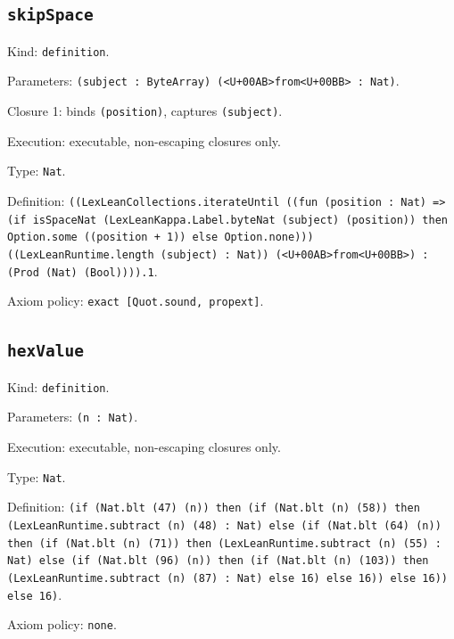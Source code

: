 \documentclass[11pt]{article}
\begin{document}
\subsection*{\texttt{skipSpace}}
\noindent Kind: \texttt{definition}.\par
\noindent Parameters: \texttt{(subject : ByteArray) (<U+00AB>from<U+00BB> : Nat)}.\par
\noindent Closure 1: binds \texttt{(position)}, captures \texttt{(subject)}.\par
\noindent Execution: executable, non-escaping closures only.\par
\noindent Type: \texttt{Nat}.\par
\noindent Definition: \texttt{((LexLeanCollections.iterateUntil ((fun (position : Nat) => (if isSpaceNat (LexLeanKappa.Label.byteNat (subject) (position)) then Option.some ((position + 1)) else Option.none))) ((LexLeanRuntime.length (subject) : Nat)) (<U+00AB>from<U+00BB>) : (Prod (Nat) (Bool)))).1}.\par
\noindent Axiom policy: \texttt{exact [Quot.sound, propext]}.\par
\subsection*{\texttt{hexValue}}
\noindent Kind: \texttt{definition}.\par
\noindent Parameters: \texttt{(n : Nat)}.\par
\noindent Execution: executable, non-escaping closures only.\par
\noindent Type: \texttt{Nat}.\par
\noindent Definition: \texttt{(if (Nat.blt (47) (n)) then (if (Nat.blt (n) (58)) then (LexLeanRuntime.subtract (n) (48) : Nat) else (if (Nat.blt (64) (n)) then (if (Nat.blt (n) (71)) then (LexLeanRuntime.subtract (n) (55) : Nat) else (if (Nat.blt (96) (n)) then (if (Nat.blt (n) (103)) then (LexLeanRuntime.subtract (n) (87) : Nat) else 16) else 16)) else 16)) else 16)}.\par
\noindent Axiom policy: \texttt{none}.\par
\end{document}

